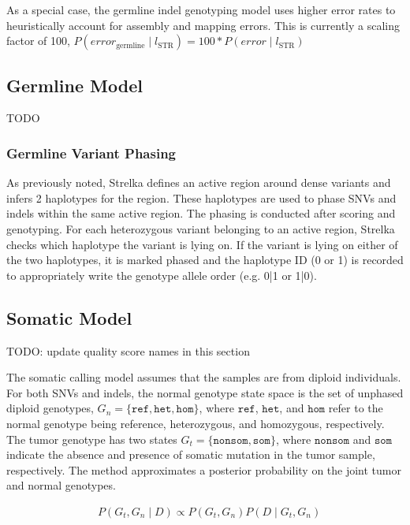 \documentclass{article}
\begin{document}
As a special case, the germline indel genotyping model uses higher error rates to heuristically account for assembly and mapping errors. This is currently a scaling factor of 100, $P(error_{\text{germline}} \mid l_{\text{STR}}) = 100 * P(error \mid l_{\text{STR}})$


\subsection{Germline Model}


TODO


\subsubsection{Germline Variant Phasing}
\label{sec:ReadBackedPhasing}
As previously noted, Strelka defines an active region around dense variants and infers 2 haplotypes for the region. These haplotypes are used to phase SNVs and indels within the same active region. The phasing is conducted after scoring and genotyping. For each heterozygous variant belonging to an active region, Strelka checks which haplotype the variant is lying on. If the variant is lying on either of the two haplotypes, it is marked phased and the haplotype ID (0 or 1) is recorded to appropriately write the genotype allele order (e.g. 0|1 or 1|0).


\subsection{Somatic Model}

TODO: update quality score names in this section

The somatic calling model assumes that the samples are from diploid individuals. For both SNVs and indels, the normal genotype state space is the set of unphased diploid genotypes, $G_n = \{ \texttt{ref}, \texttt{het}, \texttt{hom}\}$, where $\texttt{ref}$, $\texttt{het}$, and $\texttt{hom}$ refer to the normal genotype being reference, heterozygous, and homozygous, respectively. The tumor genotype has two states $G_t = \{ \texttt{nonsom}, \texttt{som} \}$, where $\texttt{nonsom}$ and $\texttt{som}$ indicate the absence and presence of somatic mutation in the tumor sample, respectively. The method approximates a posterior probability on the joint tumor and normal genotypes.

\begin{align*}
	& P(G_t,G_n \mid D) \propto P(G_t,G_n) P(D \mid G_t,G_n) \\
\end{align*}
\end{document}
